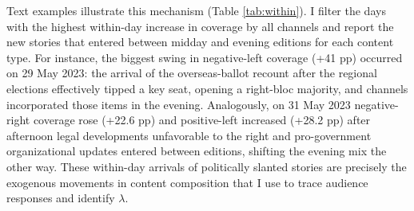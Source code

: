 \documentclass[12pt]{article}
\begin{document}
Text examples illustrate this mechanism (Table \ref{tab:within}). I filter the days with the highest within-day increase in coverage by all channels and report the new stories that entered between midday and evening editions for each content type. For instance, the biggest swing in negative-left coverage (+41 pp) occurred on 29 May 2023: the arrival of the overseas-ballot recount after the regional elections effectively tipped a key seat, opening a right-bloc majority, and channels incorporated those items in the evening. Analogously, on 31 May 2023 negative-right coverage rose (+22.6 pp) and positive-left increased (+28.2 pp) after afternoon legal developments unfavorable to the right and pro-government organizational updates entered between editions, shifting the evening mix the other way. These within-day arrivals of politically slanted stories are precisely the exogenous movements in content composition that I use to trace audience responses and identify $\lambda$.




\end{document}
